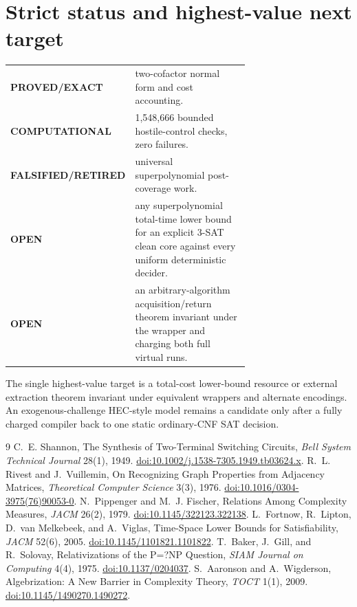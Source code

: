 \documentclass[11pt]{article}
\newcommand{\Status}[1]{\textbf{#1}}
\begin{document}
\section{Strict status and highest-value next target}
\begin{center}
\begin{tabular}{lp{0.69\linewidth}}
\toprule
\Status{PROVED/EXACT} & two-cofactor normal form and cost accounting.\\
\Status{COMPUTATIONAL} & 1,548,666 bounded hostile-control checks, zero
failures.\\
\Status{FALSIFIED/RETIRED} & universal superpolynomial post-coverage work.\\
\Status{OPEN} & any superpolynomial total-time lower bound for an explicit
3-SAT clean core against every uniform deterministic decider.\\
\Status{OPEN} & an arbitrary-algorithm acquisition/return theorem invariant
under the wrapper and charging both full virtual runs.\\
\bottomrule
\end{tabular}
\end{center}
The single highest-value target is a total-cost lower-bound resource or
external extraction theorem invariant under equivalent wrappers and alternate
encodings. An exogenous-challenge HEC-style model remains a candidate only
after a fully charged compiler back to one static ordinary-CNF SAT decision.

\begin{thebibliography}{9}
C.~E. Shannon, The Synthesis of Two-Terminal Switching Circuits,
\emph{Bell System Technical Journal} 28(1), 1949.
\href{https://doi.org/10.1002/j.1538-7305.1949.tb03624.x}{doi:10.1002/j.1538-7305.1949.tb03624.x}.
R.~L. Rivest and J.~Vuillemin, On Recognizing Graph Properties from
Adjacency Matrices, \emph{Theoretical Computer Science} 3(3), 1976.
\href{https://doi.org/10.1016/0304-3975(76)90053-0}{doi:10.1016/0304-3975(76)90053-0}.
N.~Pippenger and M.~J. Fischer, Relations Among Complexity Measures,
\emph{JACM} 26(2), 1979.
\href{https://doi.org/10.1145/322123.322138}{doi:10.1145/322123.322138}.
L.~Fortnow, R.~Lipton, D.~van Melkebeek, and A.~Viglas,
Time-Space Lower Bounds for Satisfiability, \emph{JACM} 52(6), 2005.
\href{https://doi.org/10.1145/1101821.1101822}{doi:10.1145/1101821.1101822}.
T.~Baker, J.~Gill, and R.~Solovay, Relativizations of the P=?NP Question,
\emph{SIAM Journal on Computing} 4(4), 1975.
\href{https://doi.org/10.1137/0204037}{doi:10.1137/0204037}.
S.~Aaronson and A.~Wigderson, Algebrization: A New Barrier in Complexity
Theory, \emph{TOCT} 1(1), 2009.
\href{https://doi.org/10.1145/1490270.1490272}{doi:10.1145/1490270.1490272}.
\end{thebibliography}

\end{document}
